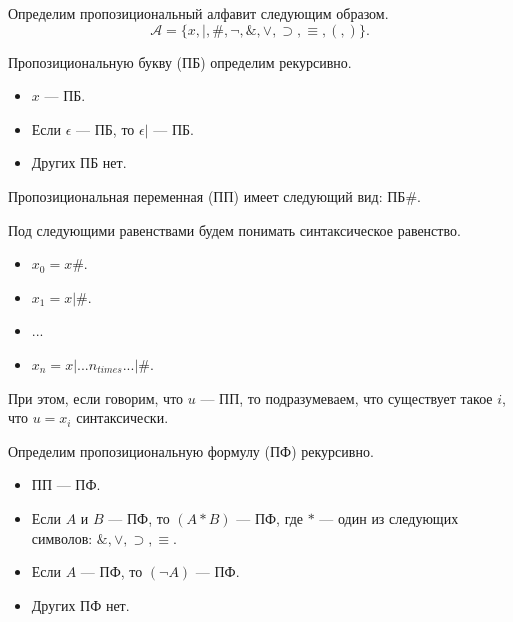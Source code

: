 


    \Header

    \BeginConspect


    
    \begin{Def}
        Определим пропозициональный алфавит следующим образом.
        $$\mathcal{A} = \{ x, |, \#, \neg, \&, \vee, \supset, \equiv, (, )  \}.$$
    \end{Def}

    \begin{Def}
        Пропозициональную букву (ПБ) определим рекурсивно.
        \begin{itemize}
            \item $x$ --- ПБ.
            \item Если $\epsilon$ --- ПБ, то $\epsilon|$ --- ПБ.
            \item Других ПБ нет.
        \end{itemize}
    \end{Def}

    \begin{Def}
        Пропозициональная переменная (ПП) имеет следующий вид: ПБ\#.
    \end{Def}

    \begin{Rem}
        Под следующими равенствами будем понимать синтаксическое равенство.
        \begin{itemize}
            \item $x_0 = x\#$.
            \item $x_1 = x|\#$.
            \item ...
            \item $x_n = x| ...n_{times}... |\#$.
        \end{itemize}
        При этом, если говорим, что $u$ --- ПП, то подразумеваем, что существует такое $i$, что $u = x_i$ синтаксически.
    \end{Rem}

    \begin{Def}
        Определим пропозициональную формулу (ПФ) рекурсивно.
        \begin{itemize}
            \item ПП --- ПФ.
            \item Если $A$ и $B$ --- ПФ, то $(A * B)$ --- ПФ, где $*$ --- один из следующих символов: $\&, \vee, \supset, \equiv$.
            \item Если $A$ --- ПФ, то $(\neg A)$ --- ПФ.
            \item Других ПФ нет.
        \end{itemize}
    \end{Def}

